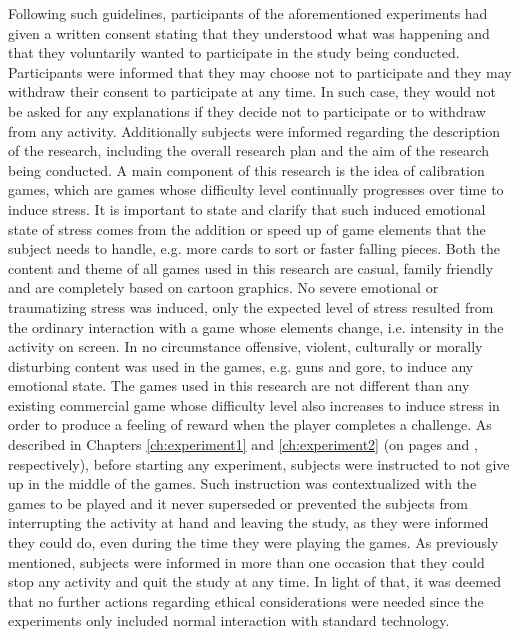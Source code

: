 Following such guidelines, participants of the aforementioned experiments had given a written consent stating that they understood what was happening and that they voluntarily wanted to participate in the study being conducted. Participants were informed that they may choose not to participate and they may withdraw their consent to participate at any time. In such case, they would not be asked for any explanations if they decide not to participate or to withdraw from any activity. Additionally subjects were informed regarding the description of the research, including the overall research plan and the aim of the research being conducted. A main component of this research is the idea of calibration games, which are games whose difficulty level continually progresses over time to induce stress. It is important to state and clarify that such induced emotional state of stress comes from the addition or speed up of game elements that the subject needs to handle, e.g. more cards to sort or faster falling pieces. Both the content and theme of all games used in this research are casual, family friendly and are completely based on cartoon graphics. No severe emotional or traumatizing stress was induced, only the expected level of stress resulted from the ordinary interaction with a game whose elements change, i.e. intensity in the activity on screen. In no circumstance offensive, violent, culturally or morally disturbing content was used in the games, e.g. guns and gore, to induce any emotional state. The games used in this research are not different than any existing commercial game whose difficulty level also increases to induce stress in order to produce a feeling of reward when the player completes a challenge. As described in Chapters \ref{ch:experiment1} and \ref{ch:experiment2} (on pages \pageref{ch:experiment1} and \pageref{ch:experiment2}, respectively), before starting any experiment, subjects were instructed to not give up in the middle of the games. Such instruction was contextualized with the games to be played and it never superseded or prevented the subjects from interrupting the activity at hand and leaving the study, as they were informed they could do, even during the time they were playing the games. As previously mentioned, subjects were informed in more than one occasion that they could stop any activity and quit the study at any time. In light of that, it was deemed that no further actions regarding ethical considerations were needed since the experiments only included normal interaction with standard technology.

